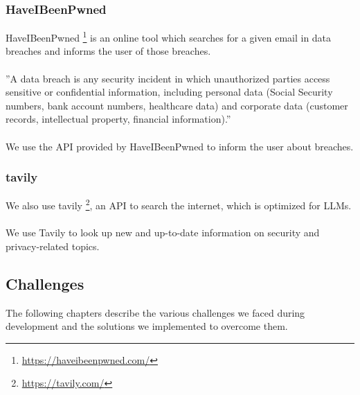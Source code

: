 \documentclass[
    a4paper,
    pagesize,
	pdftex,
    12pt,
]{scrartcl}
\begin{document}
\subsubsection{HaveIBeenPwned}
HaveIBeenPwned \footnote{\url{https://haveibeenpwned.com/}} is an online tool which searches for a given email in data breaches and informs the user of those breaches.
\\ \\
''A data breach is any security incident in which unauthorized parties access sensitive or confidential information, including personal data (Social Security numbers, bank account numbers, healthcare data) and corporate data (customer records, intellectual property, financial information).''\cite{what-is-data-breach}
\\ \\
We use the API provided by HaveIBeenPwned to inform the user about breaches.

\subsubsection{tavily}
We also use tavily \footnote{\url{https://tavily.com/}}, an API to search the internet, which is optimized for LLMs.
\\ \\
We use Tavily to look up new and up-to-date information on security and privacy-related topics.

\subsection{Challenges}
The following chapters describe the various challenges we faced during development and the solutions we implemented to overcome them.
\end{document}
